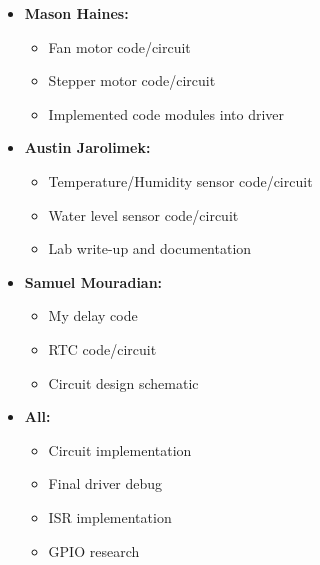 \documentclass{article}
\begin{document}
\begin{itemize}
    \item \textbf{Mason Haines:}
    \begin{itemize}
        \item Fan motor code/circuit
        \item Stepper motor code/circuit
        \item Implemented code modules into driver
    \end{itemize}

    \item \textbf{Austin Jarolimek:}
    \begin{itemize}
        \item Temperature/Humidity sensor code/circuit
        \item Water level sensor code/circuit
        \item Lab write-up and documentation
    \end{itemize}

    \item \textbf{Samuel Mouradian:}
    \begin{itemize}
        \item My delay code
        \item RTC code/circuit
        \item Circuit design schematic
    \end{itemize}

        \item \textbf{All:}
    \begin{itemize}
        \item Circuit implementation
        \item Final driver debug
        \item ISR implementation
        \item GPIO research
    \end{itemize}
\end{itemize}
\end{document}
